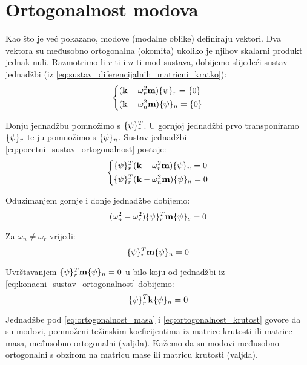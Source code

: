 \section{Ortogonalnost modova}
Kao što je već pokazano, modove (modalne oblike) definiraju vektori. Dva vektora su
međusobno ortogonalna (okomita) ukoliko je njihov skalarni produkt jednak nuli.
Razmotrimo li $r$-ti i $n$-ti mod sustava, dobijemo slijedeći sustav jednadžbi 
(iz \eqref{eq:sustav_diferencijalnih_matricni_kratko}):
\begin{equation}\label{eq:pocetni_sustav_ortogonalnost}
    \begin{dcases}
        (\kk-\omega_r^2\mm)\vtor{\psi}{}_r=\vtor{0}{}\\
        (\kk-\omega_n^2\mm)\vtor{\psi}{}_n=\vtor{0}{}
    \end{dcases}
\end{equation}

Donju jednadžbu pomnožimo s $\vtor{\psi}{}_r^T$. U gornjoj jednadžbi prvo
transponiramo $\vtor{\psi}{}_r$ te ju pomnožimo s $\vtor{\psi}{}_n$. Sustav jednadžbi
\eqref{eq:pocetni_sustav_ortogonalnost} postaje:
\begin{equation}\label{eq:konacni_sustav_ortogonalnost}
    \begin{dcases}
        \vtor{\psi}{}_r^T(\kk-\omega_r^2\mm)\vtor{\psi}{}_n=0\\
        \vtor{\psi}{}_r^T(\kk-\omega_n^2\mm)\vtor{\psi}{}_n=0
    \end{dcases}
\end{equation}

Oduzimanjem gornje i donje jednadžbe dobijemo:
\begin{equation}
    (\omega_n^2-\omega_r^2)\vtor{\psi}{}_r^T\mm\vtor{\psi}{}_s=0
\end{equation}

Za $\omega_n\neq\omega_r$ vrijedi:
\begin{equation}\label{eq:ortogonalnost_masa}
    \vtor{\psi}{}_r^T\mm\vtor{\psi}{}_n=0
\end{equation}

Uvrštavanjem $\vtor{\psi}{}_r^T\mm\vtor{\psi}{}_n=0$ u bilo koju od jednadžbi iz
\eqref{eq:konacni_sustav_ortogonalnost} dobijemo:
\begin{equation}\label{eq:ortogonalnost_krutost}
    \vtor{\psi}{}_r^T\kk\vtor{\psi}{}_n=0
\end{equation}

Jednadžbe pod \eqref{eq:ortogonalnost_masa} i \eqref{eq:ortogonalnost_krutost}
govore da su modovi, pomnoženi težinskim koeficijentima iz matrice krutosti ili
matrice masa, međusobno ortogonalni (valjda). Kažemo da su modovi međusobno ortogonalni s
obzirom na matricu mase ili matricu krutosti (valjda).
\par

